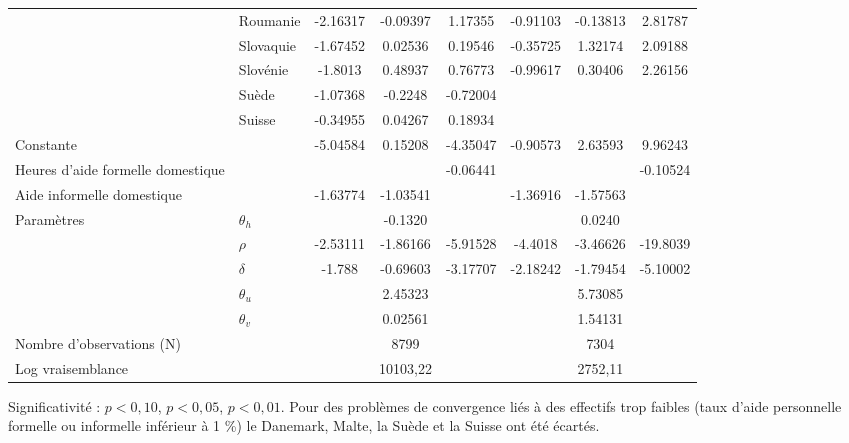 \begin{Article}
\begin{refsection}[Bonnal]
\begin{table}
{\begin{threeparttable}
\begin{tabular}{l@{}l@{} S!{\qquad}S!{\qquad}S!{\quad} |S!{\qquad}S!{\qquad}S!{\quad}}
	& Roumanie & -2.16317\sym{***} & -0.09397 & 1.17355\sym{***} & -0.91103\sym{**} & -0.13813 & 2.81787\sym{***}\\
	& Slovaquie & -1.67452\sym{***} & 0.02536 & 0.19546 & -0.35725 & 1.32174\sym{*} & 2.09188\sym{***}\\
	& Slovénie & -1.8013\sym{***} & 0.48937\sym{**} & 0.76773\sym{***} & -0.99617\sym{***} & 0.30406 & 2.26156\sym{***}\\
	& Suède & -1.07368\sym{***} & -0.2248 & -0.72004\sym{**} &&&\\
	& Suisse & -0.34955\sym{***} & 0.04267 & 0.18934 &&&\\ \hline
	Constante & & -5.04584\sym{***} & 0.15208 & -4.35047\sym{***} & -0.90573 & 2.63593\sym{**} & 9.96243\\\hline\hline
	Heures d'aide formelle domestique & & & &-0.06441\sym{***} & & & -0.10524\sym{***}\\
	Aide informelle domestique & & -1.63774\sym{***} & -1.03541\sym{***} && -1.36916\sym{***} & -1.57563\sym{***} & \\\hline\hline
	Paramètres & $\theta_h$ & & -0.1320 & & & 0.0240 & \\
	& $\rho$ & -2.53111\sym{***} & -1.86166\sym{***} & -5.91528\sym{***} & -4.4018\sym{***} & -3.46626\sym{***} & -19.8039\sym{***}\\
		& $\delta$ & -1.788\sym{***} & -0.69603\sym{***} & -3.17707\sym{***}& -2.18242\sym{***} & -1.79454\sym{***} & -5.10002\sym{***} \\
		& $\theta_u$ & & 2.45323\sym{***} & & & 5.73085\sym{***} &\\
		& $\theta_v$ & & 0.02561 & & & 1.54131\sym{***} &\\\hline
	Nombre d'observations (N) &&& 8799 &&& 7304 &\\\hline
	Log vraisemblance &&& \text{-}10103,22 &&& \text{-}2752,11 &\\\hline\hline
\end{tabular}
\begin{tablenotes} \footnotesize
\item Significativité : \sym{*} $p<0,10$, \sym{**} $p<0,05$, \sym{***} $p<0,01$. Pour des problèmes de convergence liés à des effectifs trop faibles (taux d'aide personnelle formelle ou informelle inférieur à 1 \%) le Danemark, Malte, la Suède et la Suisse ont été écartés.
\end{tablenotes}
\end{threeparttable}
}
\end{table}


\end{refsection}
\end{Article}
